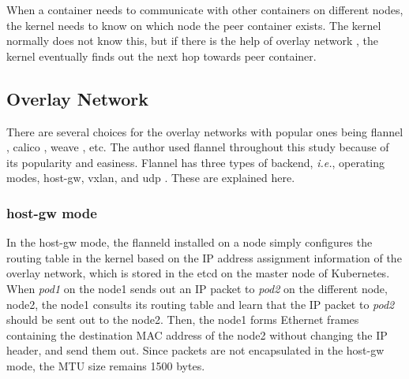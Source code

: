 When a container needs to communicate with other containers on different nodes, the kernel needs to know on which node the peer container exists.
The kernel normally does not know this, but if there is the help of overlay network \cite{zismer2016performance}, the kernel eventually finds out the next hop towards peer container.

\FloatBarrier

\subsection{Overlay Network}

There are several choices for the overlay networks with popular ones being flannel \cite{CoreOSFlannel}, calico \cite{ProjectCalico}, weave \cite{WeaveNet}, etc.
The author used flannel throughout this study because of its popularity and easiness.
Flannel has three types of backend, {\it i.e.}, operating modes, host-gw, vxlan, and udp \cite{CoreOSFlannelBackend}.
These are explained here.

\subsubsection{host-gw mode}

In the host-gw mode, the flanneld installed on a node simply configures the routing table in the kernel 
based on the IP address assignment information of the overlay network, which is stored in the etcd \cite{CoreOSEtcd} on the master node of Kubernetes.
When {\em pod1} on the node1 sends out an IP packet to {\em pod2} on the different node, node2, 
the node1 consults its routing table and learn that the IP packet to {\em pod2} should be sent out to the node2.
Then, the node1 forms Ethernet frames containing the destination MAC address of the node2 
without changing the IP header, and send them out.
Since packets are not encapsulated in the host-gw mode, the MTU size remains 1500 bytes.

